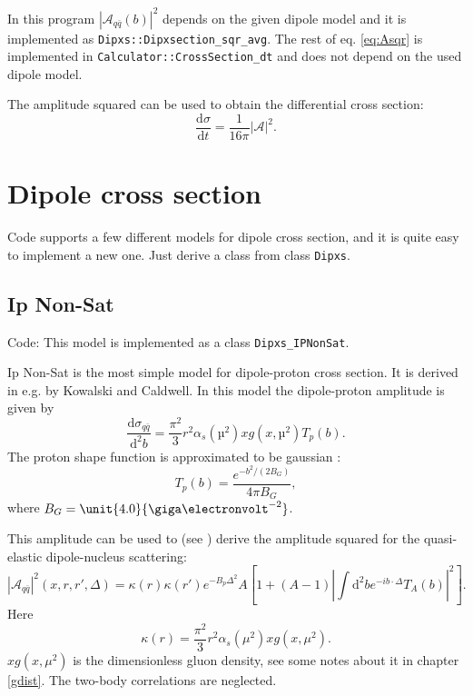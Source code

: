 \documentclass[a4paper,12pt]{article}
\newcommand{\code}[1]{\texttt{#1}}
\newcommand{\der}{\mathrm{d}}
\newcommand{\A}{\mathcal{A}}
\begin{document}
In this program $|\A_{q\bar q}(b)|^2$ depends on the given dipole model and it is implemented as \code{Dipxs::Dipxsection\_sqr\_avg}. The rest of eq. \eqref{eq:Asqr} is implemented in \code{Calculator::CrossSection\_dt} and does not depend on the used dipole model.

The amplitude squared can be used to obtain the differential cross section:
\begin{equation}
	\frac{\der \sigma}{\der t} = \frac{1}{16\pi} |\A|^2 .
\end{equation}

\section{Dipole cross section}
Code supports a few different models for dipole cross section, and it is quite easy to implement a new one. Just derive a class from class \code{Dipxs}.

\subsection{Ip Non-Sat}
Code: This model is implemented as a class \code{Dipxs\_IPNonSat}.

Ip Non-Sat is the most simple model for dipole-proton cross section. It is derived in e.g. \cite{Caldwell:2009ke} by Kowalski and Caldwell. In this model the dipole-proton amplitude is given by
\begin{equation}
	\label{eq:nonsat-d2b}
	\frac{\der \sigma_{q\bar q}}{\der^2 b} = \frac{\pi^2}{3}r^2 \alpha_s(µ^2)xg(x,µ^2) T_p(b). 
\end{equation}
The proton shape function is approximated to be gaussian \cite{Caldwell:2009ke}:
\begin{equation}
	T_p(b) = \frac{e^{-b^2/(2B_G)}}{4\pi B_G},
\end{equation}
where $B_G=\unit{4.0}{\giga\electronvolt^{-2}}$.

This amplitude can be used to (see \cite{Caldwell:2009ke}) derive the amplitude squared for the quasi-elastic dipole-nucleus scattering:
\begin{equation}
	|\A_{q\bar q}|^2(x,r,r',\Delta) = \kappa(r) \kappa(r') e^{-B_p \Delta^2} A  \left[ 1 + (A-1) \left| \int \der^2 b e^{-ib \cdot \Delta} T_A(b)\right|^2 \right] . 
\end{equation}
Here 
\begin{equation}
	\label{eq:kappa}
	\kappa(r) = \frac{\pi^2}{3}r^2\alpha_s(\mu^2)xg(x,\mu^2).
\end{equation}
$xg(x,\mu^2)$ is the dimensionless gluon density, see some notes about it in chapter \ref{gdist}. The two-body correlations are neglected.
\end{document}
